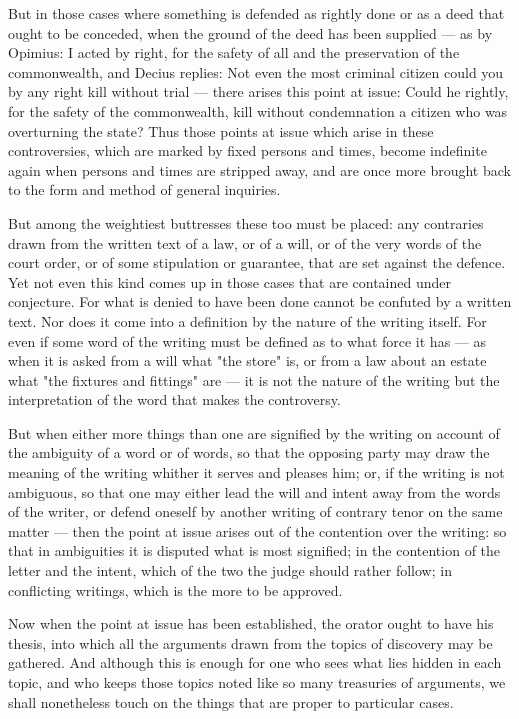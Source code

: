  But in those cases where something is defended as rightly done or as a deed that ought to be conceded, when the ground of the deed has been supplied — as by Opimius: I acted by right, for the safety of all and the preservation of the commonwealth, and Decius replies: Not even the most criminal citizen could you by any right kill without trial — there arises this point at issue: Could he rightly, for the safety of the commonwealth, kill without condemnation a citizen who was overturning the state? Thus those points at issue which arise in these controversies, which are marked by fixed persons and times, become indefinite again when persons and times are stripped away, and are once more brought back to the form and method of general inquiries.

 But among the weightiest buttresses these too must be placed: any contraries drawn from the written text of a law, or of a will, or of the very words of the court order, or of some stipulation or guarantee, that are set against the defence. Yet not even this kind comes up in those cases that are contained under conjecture. For what is denied to have been done cannot be confuted by a written text. Nor does it come into a definition by the nature of the writing itself. For even if some word of the writing must be defined as to what force it has — as when it is asked from a will what "the store" is, or from a law about an estate what "the fixtures and fittings" are — it is not the nature of the writing but the interpretation of the word that makes the controversy.

 But when either more things than one are signified by the writing on account of the ambiguity of a word or of words, so that the opposing party may draw the meaning of the writing whither it serves and pleases him; or, if the writing is not ambiguous, so that one may either lead the will and intent away from the words of the writer, or defend oneself by another writing of contrary tenor on the same matter — then the point at issue arises out of the contention over the writing: so that in ambiguities it is disputed what is most signified; in the contention of the letter and the intent, which of the two the judge should rather follow; in conflicting writings, which is the more to be approved.

 Now when the point at issue has been established, the orator ought to have his thesis, into which all the arguments drawn from the topics of discovery may be gathered. And although this is enough for one who sees what lies hidden in each topic, and who keeps those topics noted like so many treasuries of arguments, we shall nonetheless touch on the things that are proper to particular cases.

